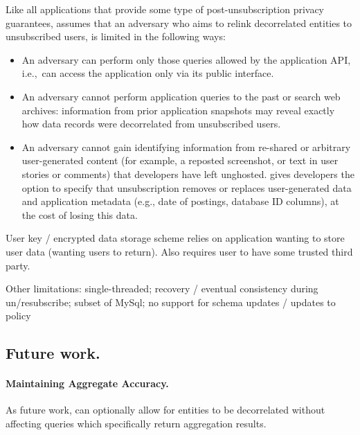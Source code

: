 Like all applications that provide some type of post-unsubscription privacy guarantees, \name assumes
that an adversary who aims to relink decorrelated entities to unsubscribed users, is limited in the
following ways:
\begin{itemize}
    \item An adversary can perform only those queries allowed by the application API,
i.e.,\ can access the application only via its public interface.

    \item An adversary cannot perform application queries to the past or search web archives:
    information from prior application snapshots may reveal
    exactly how data records were decorrelated from unsubscribed users.

    \item An adversary cannot gain identifying information from re-shared or arbitrary
        user-generated content (for example, a reposted screenshot, or text in user stories or
        comments) that developers have left unghosted. 
        \name gives developers the option to specify that unsubscription removes or replaces
        user-generated data and application metadata (e.g., date of postings, database ID columns),
        at the cost of losing this data.
\end{itemize}

User key / encrypted data storage scheme relies on application wanting to store user data (wanting
users to return). Also requires user to have some trusted third party.

Other limitations: 
single-threaded;
recovery / eventual consistency during un/resubscribe;
subset of MySql;
no support for schema updates / updates to policy

\subsection{Future work.}
\paragraph{Maintaining Aggregate Accuracy.}
As future work, \sys can optionally allow for entities to be decorrelated without affecting queries which
specifically return aggregation results.

